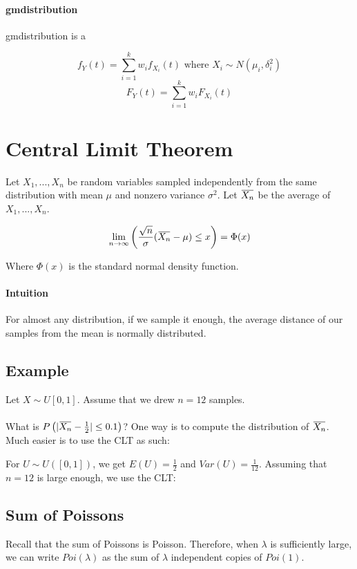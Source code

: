 \documentclass[a4paper]{article}
\newcommand{\mean}[1]{\mkern 1.5mu\overline{\mkern-1.5mu#1\mkern-1.5mu}\mkern 1.5mu}
\begin{document}
\paragraph{gmdistribution}
gmdistribution is a 

\[f_Y(t)=\sum_{i=1}^{k} w_i f_{X_i}(t) \text{ where } X_i \sim N(\mu_i,\delta_i^2)\]
\[F_Y(t)=\sum_{i=1}^k w_i F_{X_i}(t)\]

\section{Central Limit Theorem}
Let $X_1,...,X_n$ be random variables sampled independently from the same distribution with mean $\mu$ and nonzero variance $\sigma^2$. Let $\mean{X_n}$ be the average of $X_1,...,X_n$.

\[\lim_{n\to\infty} \left( \frac{\sqrt{n}}{\sigma} (\mean{X_n}-\mu) \le x \right)=\Phi(x)\]

Where $\Phi(x)$ is the standard normal density function.


\paragraph{Intuition}
For almost any distribution, if we sample it enough, the average distance of our samples from the mean is normally distributed.

\subsection{Example}
Let $X\sim U[0,1]$. Assume that we drew $n=12$ samples.

\paragraph{}
What is $P\left( |\mean{X_n} - \frac{1}{2}| \le 0.1 \right)$? One way is to compute the distribution of $\mean{X_n}$. Much easier is to use the CLT as such:

For $U\sim U([0,1])$, we get $E(U)=\frac{1}{2}$ and $Var(U)=\frac{1}{12}$. Assuming that $n=12$ is large enough, we use the CLT:


\subsection{Sum of Poissons}
Recall that the sum of Poissons is Poisson. Therefore, when $\lambda$ is sufficiently large, we can write $Poi(\lambda)$ as the sum of $\lambda$ independent copies of $Poi(1)$.
\end{document}
